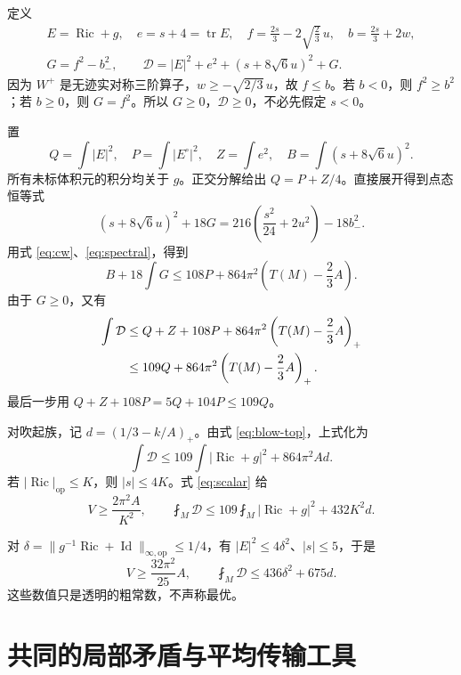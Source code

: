 \documentclass[UTF8,fontset=fandol,zihao=-4]{ctexart}
\theoremstyle{cn}
\DeclareMathOperator{\Ric}{Ric}
\DeclareMathOperator{\tr}{tr}
\DeclareMathOperator{\Id}{Id}
\newcommand{\op}{\mathrm{op}}
\newcommand{\av}{\fint}
\newcommand{\Dcal}{\mathcal D}
\numberwithin{equation}{section}
\begin{document}
定义
\begin{gather}
E=\Ric+g,\quad e=s+4=\tr E,\quad
f=\frac{2s}{3}-2\sqrt{\frac23}\,u,\quad b=\frac{2s}{3}+2w,\label{eq:defs}\\
G=f^2-b_-^2,\qquad
\Dcal=|E|^2+e^2+(s+8\sqrt6u)^2+G.\label{eq:density}
\end{gather}
因为 $W^+$ 是无迹实对称三阶算子，$w\ge-\sqrt{2/3}\,u$，故 $f\le b$。若 $b<0$，则 $f^2\ge b^2$；若 $b\ge0$，则 $G=f^2$。所以 $G\ge0$，$\Dcal\ge0$，不必先假定 $s<0$。

置
\[
Q=\int|E|^2,\quad P=\int|E^\circ|^2,\quad
Z=\int e^2,\quad B=\int(s+8\sqrt6u)^2.
\]
所有未标体积元的积分均关于 $g$。正交分解给出 $Q=P+Z/4$。直接展开得到点态恒等式
\begin{equation}\label{eq:calibration}
(s+8\sqrt6u)^2+18G
=216\left(\frac{s^2}{24}+2u^2\right)-18b_-^2.
\end{equation}
用式 \eqref{eq:cw}、\eqref{eq:spectral}，得到
\begin{equation}\label{eq:budget-raw}
B+18\int G\le108P+864\pi^2\left(T(M)-\frac23A\right).
\end{equation}
由于 $G\ge0$，又有
\begin{align}
\int\Dcal
&\le Q+Z+108P+864\pi^2\left(T(M)-\frac23A\right)_+\notag\\
&\le109Q+864\pi^2\left(T(M)-\frac23A\right)_+.\label{eq:budget-general}
\end{align}
最后一步用 $Q+Z+108P=5Q+104P\le109Q$。

对吹起族，记 $d=(1/3-k/A)_+$。由式 \eqref{eq:blow-top}，上式化为
\begin{equation}\label{eq:budget-blow}
\int\Dcal\le109\int|\Ric+g|^2+864\pi^2Ad.
\end{equation}
若 $|\Ric|_{\op}\le K$，则 $|s|\le4K$。式 \eqref{eq:scalar} 给
\begin{equation}\label{eq:l2-budget}
V\ge\frac{2\pi^2A}{K^2},\qquad
\av_M\Dcal\le109\av_M|\Ric+g|^2+432K^2d.
\end{equation}

对 $\delta=\|g^{-1}\Ric+\Id\|_{\infty,\op}\le1/4$，有 $|E|^2\le4\delta^2$、$|s|\le5$，于是
\begin{equation}\label{eq:delta-budget}
V\ge\frac{32\pi^2}{25}A,\qquad
\boxed{\av_M\Dcal\le436\delta^2+675d.}
\end{equation}
这些数值只是透明的粗常数，不声称最优。

\section{共同的局部矛盾与平均传输工具}
\end{document}
